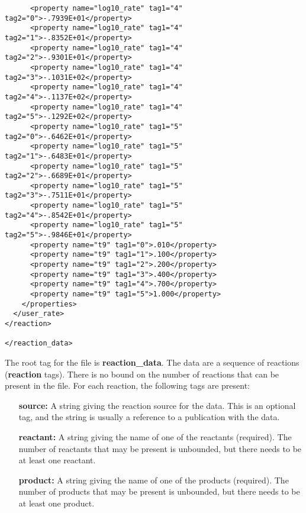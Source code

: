 \documentclass{article}    %
\begin{document}
\begin{verbatim}
      <property name="log10_rate" tag1="4" tag2="0">-.7939E+01</property>
      <property name="log10_rate" tag1="4" tag2="1">-.8352E+01</property>
      <property name="log10_rate" tag1="4" tag2="2">-.9301E+01</property>
      <property name="log10_rate" tag1="4" tag2="3">-.1031E+02</property>
      <property name="log10_rate" tag1="4" tag2="4">-.1137E+02</property>
      <property name="log10_rate" tag1="4" tag2="5">-.1292E+02</property>
      <property name="log10_rate" tag1="5" tag2="0">-.6462E+01</property>
      <property name="log10_rate" tag1="5" tag2="1">-.6483E+01</property>
      <property name="log10_rate" tag1="5" tag2="2">-.6689E+01</property>
      <property name="log10_rate" tag1="5" tag2="3">-.7511E+01</property>
      <property name="log10_rate" tag1="5" tag2="4">-.8542E+01</property>
      <property name="log10_rate" tag1="5" tag2="5">-.9846E+01</property>
      <property name="t9" tag1="0">.010</property>
      <property name="t9" tag1="1">.100</property>
      <property name="t9" tag1="2">.200</property>
      <property name="t9" tag1="3">.400</property>
      <property name="t9" tag1="4">.700</property>
      <property name="t9" tag1="5">1.000</property>
    </properties>
  </user_rate>
</reaction>

</reaction_data>

\end{verbatim}

The root tag for the file is {\bf reaction\_data}.  The data are a
sequence of reactions ({\bf reaction} tags).  There is no bound on
the number of reactions that can be present in the file.  For each
reaction, the following tags are present:

\begin{itemize}

\item[{\bf source:}] A string giving the reaction source for the
data.  This is an optional tag, and the string is usually a
reference to a publication with the data.

\item[{\bf reactant:}] A string giving the name of one of the
reactants (required).  The number of reactants that may be present
is unbounded, but there needs to be at least one reactant.

\item[{\bf product:}] A string giving the name of one of the products
(required).  The number of products that may be present is
unbounded, but there needs to be at least one product.

\end{itemize}
\end{document}
